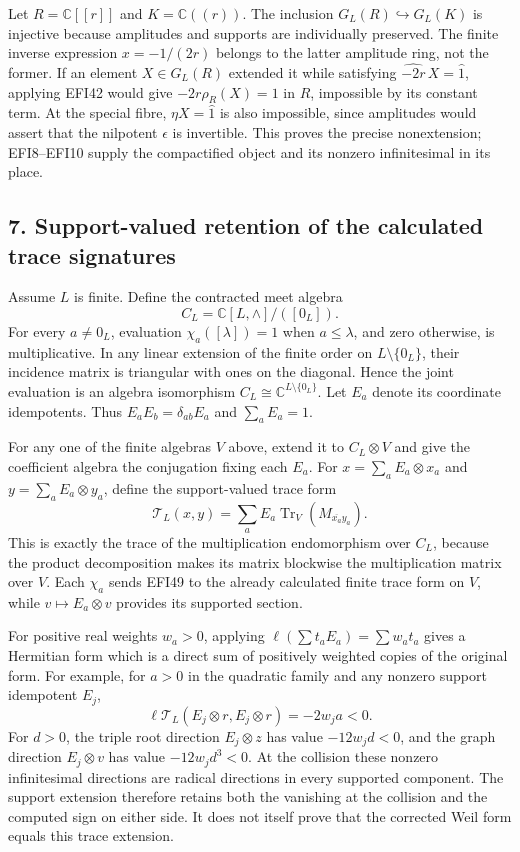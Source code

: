 \documentclass[
  10pt,
  a4paper,
]{article}
\newcounter{none} %
\begin{document}
Let \(R=\mathbb C[[r]]\) and \(K=\mathbb C((r))\). The inclusion
\(G_L(R)\hookrightarrow G_L(K)\) is injective because amplitudes and
supports are individually preserved. The finite inverse expression
\(x=-1/(2r)\) belongs to the latter amplitude ring, not the former. If
an element \(X\in G_L(R)\) extended it while satisfying
\(\widehat{-2r}\,X=\widehat1\), applying EFI42 would give
\(-2r\rho_R(X)=1\) in \(R\), impossible by its constant term. At the
special fibre, \(\eta X=\widehat1\) is also impossible, since amplitudes
would assert that the nilpotent \(\epsilon\) is invertible. This proves
the precise nonextension; EFI8--EFI10 supply the compactified object and
its nonzero infinitesimal in its place.

\subsection{7. Support-valued retention of the calculated trace
signatures}\label{support-valued-retention-of-the-calculated-trace-signatures}

Assume \(L\) is finite. Define the contracted meet algebra \[
C_L=\mathbb C[L,\wedge]/([0_L]).
\tag{EFI48}
\] For every \(a\ne0_L\), evaluation \(\chi_a([\lambda])=1\) when
\(a\le\lambda\), and zero otherwise, is multiplicative. In any linear
extension of the finite order on \(L\setminus\{0_L\}\), their incidence
matrix is triangular with ones on the diagonal. Hence the joint
evaluation is an algebra isomorphism
\(C_L\cong\mathbb C^{L\setminus\{0_L\}}\). Let \(E_a\) denote its
coordinate idempotents. Thus \(E_aE_b=\delta_{ab}E_a\) and
\(\sum_aE_a=1\).

For any one of the finite algebras \(V\) above, extend it to
\(C_L\otimes V\) and give the coefficient algebra the conjugation fixing
each \(E_a\). For \(x=\sum_aE_a\otimes x_a\) and
\(y=\sum_aE_a\otimes y_a\), define the support-valued trace form \[
\mathcal T_L(x,y)=\sum_a E_a
\operatorname{Tr}_V(M_{\overline{x_a}y_a}).
\tag{EFI49}
\] This is exactly the trace of the multiplication endomorphism over
\(C_L\), because the product decomposition makes its matrix blockwise
the multiplication matrix over \(V\). Each \(\chi_a\) sends EFI49 to the
already calculated finite trace form on \(V\), while
\(v\mapsto E_a\otimes v\) provides its supported section.

For positive real weights \(w_a>0\), applying
\(\ell(\sum t_aE_a)=\sum w_at_a\) gives a Hermitian form which is a
direct sum of positively weighted copies of the original form. For
example, for \(a>0\) in the quadratic family and any nonzero support
idempotent \(E_j\), \[
\ell\mathcal T_L(E_j\otimes r,E_j\otimes r)=-2w_ja<0.
\tag{EFI50}
\] For \(d>0\), the triple root direction \(E_j\otimes z\) has value
\(-12w_jd<0\), and the graph direction \(E_j\otimes v\) has value
\(-12w_jd^3<0\). At the collision these nonzero infinitesimal directions
are radical directions in every supported component. The support
extension therefore retains both the vanishing at the collision and the
computed sign on either side. It does not itself prove that the
corrected Weil form equals this trace extension.
\end{document}
